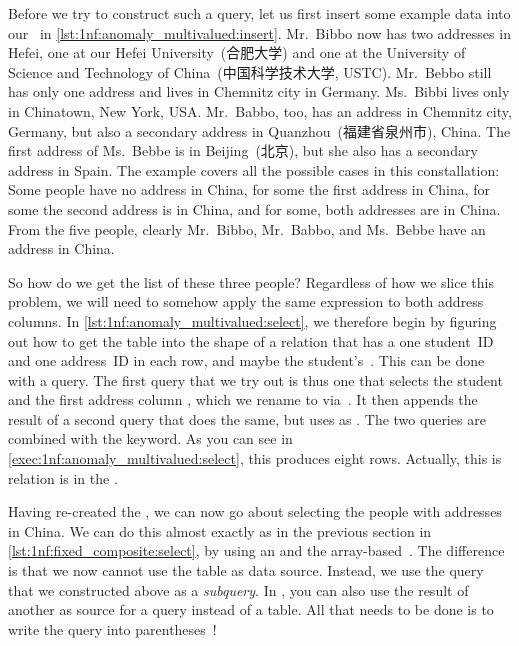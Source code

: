Before we try to construct such a query, let us first insert some example data into our \db\ in \cref{lst:1nf:anomaly_multivalued:insert}.
Mr.~Bibbo now has two addresses in Hefei, one at our Hefei University~(合肥大学) and one at the University of Science and Technology of China~(中国科学技术大学, USTC).
Mr.~Bebbo still has only one address and lives in Chemnitz city in Germany.
Ms.~Bibbi lives only in Chinatown, New York, USA.
Mr.~Babbo, too, has an address in Chemnitz city, Germany, but also a secondary address in Quanzhou~(福建省泉州市), China.
The first address of Ms.~Bebbe is in Beijing~(北京), but she also has a secondary address in Spain.
The example covers all the possible cases in this constallation:
Some people have no address in China, for some the first address in China, for some the second address is in China, and for some, both addresses are in China.
From the five people, clearly Mr.~Bibbo, Mr.~Babbo, and Ms.~Bebbe have an address in China.

So how do we get the list of these three people?
Regardless of how we slice this problem, we will need to somehow apply the same expression to both address columns.
In \cref{lst:1nf:anomaly_multivalued:select}, we therefore begin by figuring out how to get the table into the shape of a relation that has a one student~ID and one address~ID in each row, and maybe the student's~.
This can be done with a  query.
The first query that we try out is thus one that selects the student~ and the first address column , which we rename to  via~.
It then appends the result of a second query that does the same, but uses  as .
The two queries are combined with the  keyword.
As you can see in \cref{exec:1nf:anomaly_multivalued:select}, this produces eight rows.
Actually, this is relation is in the .

Having re-created the , we can now go about selecting the people with addresses in China.
We can do this almost exactly as in the previous section in \cref{lst:1nf:fixed_composite:select}, by using an  and the array-based~.
The difference is that we now cannot use the  table as data source.
Instead, we use the  query that we constructed above as a \emph{subquery}.
In \sql, you can also use the result of another  as source for a query instead of a table.
All that needs to be done is to write the query into parentheses~\sqlIdx{(\idxdots)}!

